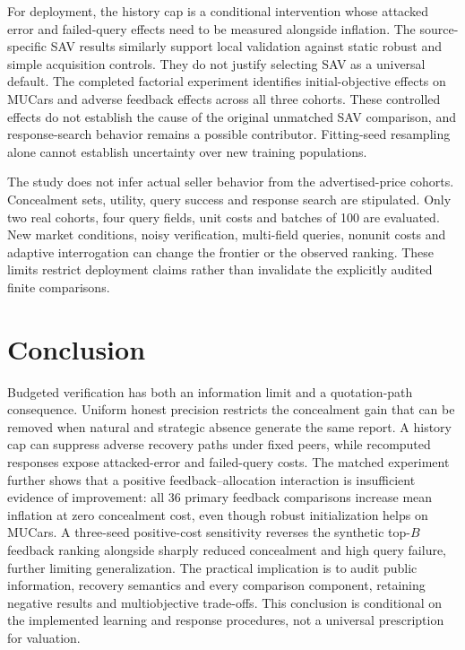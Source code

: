 \documentclass[11pt]{article}
\begin{document}
For deployment, the history cap is a conditional intervention whose attacked
error and failed-query effects need to be measured alongside inflation. The
source-specific SAV results similarly support local validation against static
robust and simple acquisition controls. They do not justify selecting SAV as
a universal default. The completed factorial experiment identifies initial-objective
effects on MUCars and adverse feedback effects across all three cohorts.
These controlled effects do not establish the cause of the original unmatched
SAV comparison, and response-search behavior remains a possible contributor. Fitting-seed resampling alone cannot establish uncertainty over
new training populations.


The study does not infer actual seller behavior from the advertised-price
cohorts. Concealment sets, utility, query success and response search are
stipulated. Only two real cohorts, four query fields, unit costs and batches
of 100 are evaluated. New market conditions, noisy verification, multi-field
queries, nonunit costs and adaptive interrogation can change the frontier or
the observed ranking. These limits restrict deployment claims rather than
invalidate the explicitly audited finite comparisons.

\section{Conclusion}\label{sec:conclusion}
Budgeted verification has both an information limit and a quotation-path
consequence. Uniform honest precision restricts the concealment gain that can
be removed when natural and strategic absence generate the same report. A
history cap can suppress adverse recovery paths under fixed peers, while
recomputed responses expose attacked-error and failed-query costs. The matched
experiment further shows that a positive feedback--allocation interaction is
insufficient evidence of improvement: all 36 primary feedback comparisons
increase mean inflation at zero concealment cost, even though robust initialization helps on MUCars. A three-seed positive-cost sensitivity reverses the synthetic top-$B$ feedback ranking alongside sharply reduced concealment and high query failure, further limiting generalization. The practical implication is to audit public information, recovery
semantics and every comparison component, retaining negative results and
multiobjective trade-offs. This conclusion is conditional on the implemented
learning and response procedures, not a universal prescription for valuation.
\end{document}
